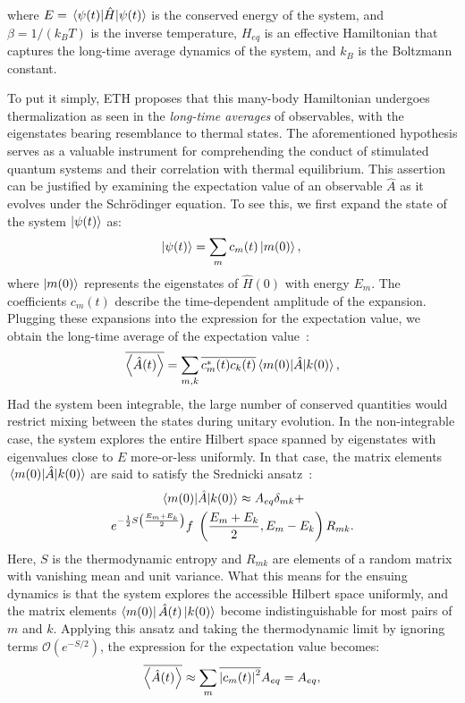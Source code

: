\documentclass[%
reprint,
superscriptaddress,
amsmath,amssymb,
aps,
prb,
showkeys,
]{revtex4-2}
\begin{document}
where $E=\expval{\hat{H}}{\psi(t)}$ is the conserved energy of the system, and $\beta = 1/(k_B T)$ is the inverse temperature, $H_{eq}$ is an effective Hamiltonian that captures the long-time average dynamics of the system, and $k_B$ is the Boltzmann constant.

To put it simply, ETH proposes that this many-body Hamiltonian undergoes thermalization as seen in the \textit{long-time averages} of observables, with the eigenstates bearing resemblance to thermal states. The aforementioned hypothesis serves as a valuable instrument for comprehending the conduct of stimulated quantum systems and their correlation with thermal equilibrium. This assertion can be justified by examining the expectation value of an observable $\hat{A}$ as it evolves under the Schr\"odinger equation. To see this, we first expand the state of the system $\ket{\psi(t)}$ as:
\begin{equation*}
\ket{\psi(t)} =  \sum_m c_m(t)\ket{m(0)},\\ 
\end{equation*}
where $\ket{m(0)}$ represents the eigenstates of $\hat{H}(0)$ with energy $E_m$. The coefficients $c_m (t)$ describe the time-dependent amplitude of the expansion.
Plugging these expansions into the expression for the expectation value, we obtain the long-time average of the expectation value~\cite{abanin_colloquium_2019}:
\begin{equation}
	\overline{\expval{\hat{A}(t)}} 
	= \sum_{m,k} \overline{c_m^\ast(t) c_k(t)}
	\mel{m(0)}{\hat{A}}{k(0)},
\end{equation}
Had the system been integrable, the large number of conserved quantities would restrict mixing between the states during unitary evolution. In the non-integrable case,
the system explores the entire Hilbert space spanned by eigenstates with eigenvalues close to $E$ more-or-less uniformly. In that case, the matrix elements $\mel{m(0)}{\hat{A}}{k(0)}$ are said to satisfy the Srednicki ansatz~\cite{Srednicki1994,Srednicki_1999}:
\begin{multline}
	\mel{m(0)}{\hat{A}}{k(0)} \approx A_{eq} \delta_{mk} +\\ e^{-\frac12 S\left(\frac{E_m+E_k}{2}\right)} f\;\left(\frac{E_m+E_k}{2}, E_m-E_k\right)R_{mk}.
\end{multline}
Here, $S$ is the thermodynamic entropy and $R_{mk}$ are elements of a random matrix with vanishing mean and unit variance. What this means for the ensuing dynamics is that the system explores the accessible Hilbert space uniformly,  and the matrix elements $\bra{m(0)}\hat{A}(t)\ket{k(0)}$ become indistinguishable for most pairs of $m$ and $k$.
Applying this ansatz and taking the thermodynamic limit by ignoring terms $\mathcal{O}(e^{-S/2})$, the expression for the expectation value becomes:
\begin{equation*}
\overline{\expval{\hat{A}(t)}} \approx \sum_m \overline{\abs{c_m(t)}^2} {A}_{eq}= {A}_{eq},
\end{equation*}
\end{document}
